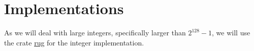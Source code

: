 \section{Implementations}

As we will deal with large integers, specifically larger than $2^{128}-1$, we will use the crate \href{https://docs.rs/rug/latest/rug/}{rug} for the integer implementation.

